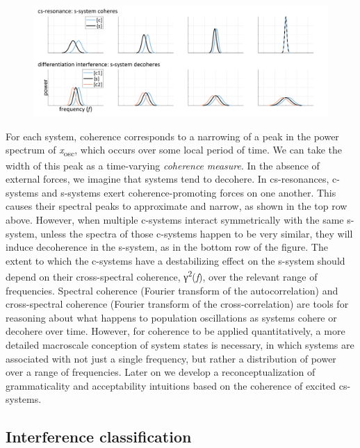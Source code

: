   
\begin{figure}
\includegraphics[width=\textwidth]{figures/Tilsen-img93.png}
\caption{\missingcaption}
\label{fig:}
\end{figure}
 

  For each system, coherence corresponds to a narrowing of a peak in the power spectrum of \textit{x}\textsubscript{osc}, which occurs over some local period of time. We can take the width of this peak as a time-varying \textit{coherence} \textit{measure}. In the absence of external forces, we imagine that systems tend to decohere. In cs-resonances, c-systems and s-systems exert coherence-promoting forces on one another. This causes their spectral peaks to approximate and narrow, as shown in the top row above. However, when multiple c-systems interact symmetrically with the same s-system, unless the spectra of those c-systems happen to be very similar, they will induce decoherence in the s-system, as in the bottom row of the figure. The extent to which the c-systems have a destabilizing effect on the s-system should depend on their cross-spectral coherence, γ\textsuperscript{2}(\textit{f}), over the relevant range of frequencies. Spectral coherence (Fourier transform of the autocorrelation) and cross-spectral coherence (Fourier transform of the cross-correlation) are tools for reasoning about what happens to population oscillations as systems cohere or decohere over time. However, for coherence to be applied quantitatively, a more detailed macroscale conception of system states is necessary, in which systems are associated with not just a single frequency, but rather a distribution of power over a range of frequencies. Later on we develop a reconceptualization of grammaticality and acceptability intuitions based on the coherence of excited cs-systems.

\subsection{Interference classification}

